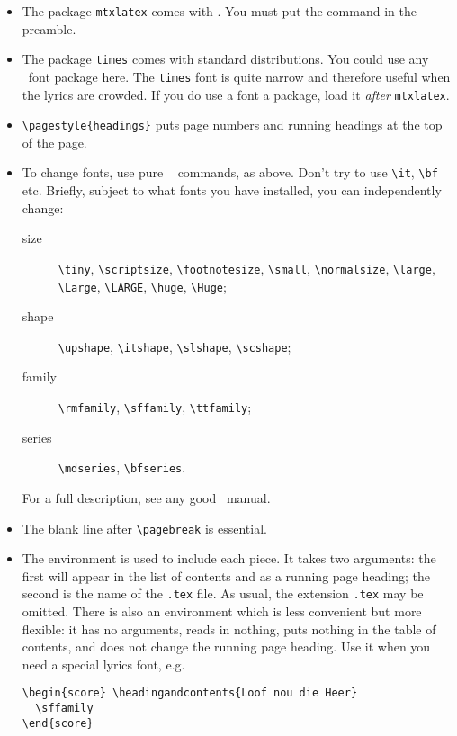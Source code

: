 \documentclass[11pt]{article}
\begin{document}
\begin{itemize}
  \item The package \texttt{mtxlatex} comes with \MTx.
You must put the command  in the preamble.
  \item The package \texttt{times} comes with standard distributions.
You could use any \LaTeXe\ font package here.  The \texttt{times}
font is quite narrow and therefore useful when the lyrics are crowded. 
If you do use a font a package, load it \emph{after} \texttt{mtxlatex}. 
  \item \verb"\pagestyle{headings}" puts page
numbers and running headings at the top of the page.
  \item To change fonts, use pure \LaTeXe\
 commands, as above.  Don't try to use \verb"\it", \verb"\bf"
etc.  Briefly, subject to what fonts you have installed,
you can independently change:
  \begin{description}
   \item[size]  \verb"\tiny",
      \verb"\scriptsize", \verb"\footnotesize", \verb"\small",
      \verb"\normalsize", \verb"\large", \verb"\Large", \verb"\LARGE",
      \verb"\huge", \verb"\Huge";
   \item[shape] \verb"\upshape", \verb"\itshape", \verb"\slshape", 
     \verb"\scshape"; 
    \item[family] \verb"\rmfamily", \verb"\sffamily", \verb"\ttfamily";
    \item[series] \verb"\mdseries", \verb"\bfseries". 
  \end{description}
For a full description, see any good \LaTeXe\ manual.
  \item  The blank line after \verb"\pagebreak" is essential.
  \item  The environment  is used to include each piece.
It takes two arguments: the first will appear in the list of
contents and as a running page heading; the second is the name
of the \texttt{.tex} file.  As usual, the extension \texttt{.tex}
may be omitted.  There is also an environment \ttxem{score}
which is less convenient but more flexible: it has no arguments,
reads in nothing, puts nothing in the table of contents, and
does not change the running page heading.  Use it when you need
a special lyrics font, e.g.
\begin{verbatim}
\begin{score} \headingandcontents{Loof nou die Heer}
  \sffamily  
\end{score}
\end{verbatim}
\end{itemize}
\end{document}
